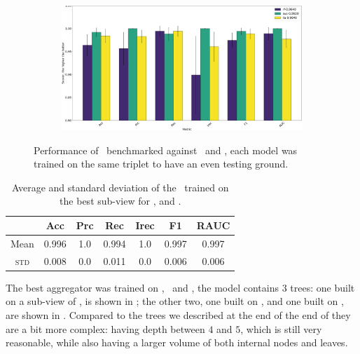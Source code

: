 \begin{figure}[!h]
\begin{subfigure}{0.49\linewidth}
		\subcaption{\an, \cnmod, \phin}
	\end{subfigure}
	\begin{subfigure}{0.49\linewidth}
		\includegraphics[width=\linewidth]{img/Bn_Cnmod_Phi_ta.png}
		\subcaption{\bn, \cnmod, \phin}
	\end{subfigure}
	\caption{Performance of \tas\ benchmarked against \rfs\ and \svcs, each model was trained on
		the same triplet to have an even testing ground.} \label{fig:triplets-performance}
\end{figure}
\begin{table}[!h]
	\caption{Average and standard deviation of the \ta\ trained on the best sub-view for \an, \bn and
		\cnmod.}\label{tbl:an-bn-cnmod-ta-perf}

	\bigskip
	\setlength{\tabcolsep}{6pt}
	\centering
	\begin{tabular}{ccccccc}
		\toprule
		\textbf{}    & \textbf{Acc} & \textbf{Prc} & \textbf{Rec} & \textbf{Irec} & \textbf{F1} & \textbf{RAUC} \\
		\midrule
		Mean         & 0.996        & 1.0          & 0.994        & 1.0           & 0.997
		             & 0.997                                                                                    \\
		\textsc{std} & 0.008        & 0.0          & 0.011        & 0.0           & 0.006
		             & 0.006                                                                                    \\
		\bottomrule
	\end{tabular}
\end{table}
The best aggregator was trained on \an, \bn\ and \cnmod, the model contains $3$ trees: one built
on a sub-view of \an, is shown in ; the other two, one built on \bn, and one
built on \cnmod, are shown in . Compared to the trees we described at the end
of the end of  they are a bit more complex: having depth between $4$ and $5$, which
is still very reasonable, while also having a larger volume of both internal nodes and leaves.

